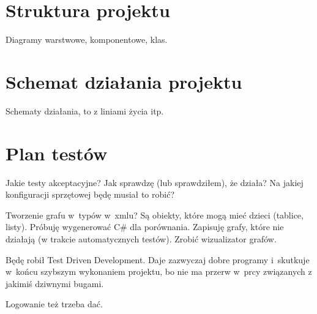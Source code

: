 \section{Struktura projektu}
Diagramy warstwowe, komponentowe, klas.

%
%
%
%
%
%
%
%
%
%

\section{Schemat działania projektu}
Schematy działania, to z liniami życia itp.

\section{Plan testów}
Jakie testy akceptacyjne? Jak sprawdzę (lub sprawdziłem), że działa? Na jakiej konfiguracji sprzętowej będę musiał to robić?

Tworzenie grafu w~typów w~xmlu? Są obiekty, które mogą mieć dzieci (tablice, listy). Próbuję wygenerować C\# dla porównania. Zapisuję grafy, które nie działają (w trakcie automatycznych testów). Zrobić wizualizator grafów.

Będę robił Test Driven Development. Daje zazwyczaj dobre programy i~skutkuje w~końcu szybszym wykonaniem projektu, bo nie ma przerw w~prcy związanych z jakimiś dziwnymi bugami.

Logowanie też trzeba dać.


